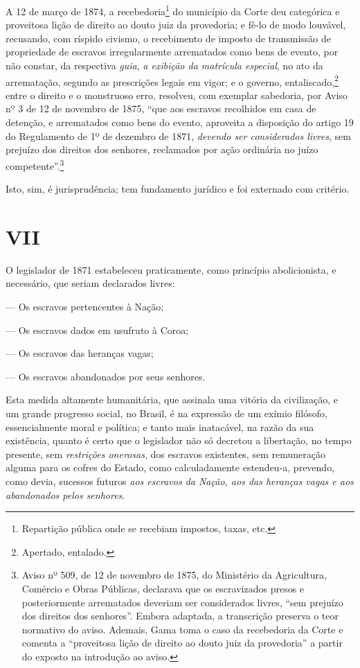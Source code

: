 A 12 de março de 1874, a recebedoria\footnote{Repartição pública onde
  se recebiam impostos, taxas, etc.} do município da Corte deu
categórica e proveitosa lição de direito ao douto juiz da provedoria; e
fê-lo de modo louvável, recusando, com ríspido civismo, o recebimento de
imposto de transmissão de propriedade de escravos irregularmente
arrematados como bens de evento, por não constar, da respectiva
\emph{guia}, \emph{a exibição da matrícula especial}, no ato da
arrematação, segundo as prescrições legais em vigor; e o governo,
entaliscado,\footnote{Apertado, entalado.} entre o direito e o
monstruoso erro, resolveu, com exemplar sabedoria, por Aviso nº 3 de 12
de novembro de 1875, ``que aos escravos recolhidos em casa de detenção, e
arrematados como bens do evento, aproveita a disposição do artigo 19 do
Regulamento de 1º de dezembro de 1871, \emph{devendo ser considerados
livres}, sem prejuízo dos direitos dos senhores, reclamados por ação
ordinária no juízo competente''.\footnote{Aviso nº 509, de 12 de novembro de 1875,
  do Ministério da Agricultura, Comércio e Obras Públicas, declarava que
  os escravizados presos e posteriormente arrematados deveriam ser
  considerados livres, ``sem prejuízo dos direitos dos senhores''. Embora
  adaptada, a transcrição preserva o teor normativo do aviso. Ademais,
  Gama toma o caso da recebedoria da Corte e comenta a ``proveitosa lição
  de direito ao douto juiz da provedoria'' a partir do exposto na
  introdução ao aviso.}

Isto, sim, é jurisprudência; tem fundamento jurídico e foi externado com
critério.

\section*{VII}

O legislador de 1871 estabeleceu praticamente, como princípio
abolicionista, e necessário, que seriam declarados livres:

--- Os escravos pertencentes à Nação;

--- Os escravos dados em usufruto à Coroa;

--- Os escravos das heranças vagas;

--- Os escravos abandonados por seus senhores.

Esta medida altamente humanitária, que assinala uma vitória da
civilização, e um grande progresso social, no Brasil, é na expressão de
um exímio filósofo, essencialmente moral e política; e tanto mais
inatacável, na razão da sua existência, quanto é certo que o legislador
não só decretou a libertação, no tempo presente, sem \emph{restrições
onerosas}, dos escravos existentes, sem remuneração alguma para os
cofres do Estado, como calculadamente estendeu-a, prevendo, como devia,
sucessos futuros \emph{aos escravos da Nação, aos das heranças vagas e
aos abandonados pelos senhores}.

